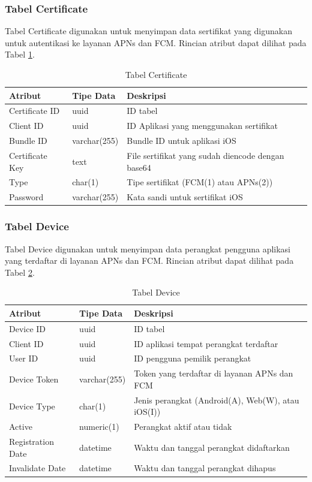\subsubsection{Tabel Certificate}
\par Tabel Certificate digunakan untuk menyimpan data sertifikat yang digunakan untuk autentikasi ke layanan APNs dan FCM. Rincian atribut dapat dilihat pada Tabel \ref{tabel_certificate}.
\begin{longtable}{|p{2cm}|p{2.5cm}|p{4.5cm}|}
	\caption{Tabel Certificate} \label{tabel_certificate} \\ \hline
    {Atribut} & {Tipe Data} & {Deskripsi} \\ \hline
    Certificate ID & uuid & ID tabel \\ \hline
    Client ID & uuid & ID Aplikasi yang menggunakan sertifikat \\ \hline
    Bundle ID & varchar(255) & Bundle ID untuk aplikasi iOS \\ \hline
    Certificate Key & text & File sertifikat yang sudah diencode dengan base64 \\ \hline
    Type & char(1) & Tipe sertifikat (FCM(1) atau APNs(2)) \\ \hline
    Password & varchar(255) & Kata sandi untuk sertifikat iOS \\ \hline
\end{longtable}

\subsubsection{Tabel Device}
\par Tabel Device digunakan untuk menyimpan data perangkat pengguna aplikasi yang terdaftar di layanan APNs dan FCM. Rincian atribut dapat dilihat pada Tabel \ref{tabel_device}.
\begin{longtable}{|p{2cm}|p{2.5cm}|p{4.5cm}|}
	\caption{Tabel Device} \label{tabel_device} \\ \hline
    {Atribut} & {Tipe Data} & {Deskripsi} \\ \hline
    Device ID & uuid & ID tabel \\ \hline
    Client ID & uuid & ID aplikasi tempat perangkat terdaftar \\ \hline
    User ID & uuid & ID pengguna pemilik perangkat \\ \hline
    Device Token & varchar(255) & Token yang terdaftar di layanan APNs dan FCM \\ \hline
    Device Type & char(1) & Jenis perangkat (Android(A), Web(W), atau iOS(I)) \\ \hline
    Active & numeric(1) & Perangkat aktif atau tidak \\ \hline
    Registration Date & datetime & Waktu dan tanggal perangkat didaftarkan \\ \hline
    Invalidate Date & datetime & Waktu dan tanggal perangkat dihapus \\ \hline
\end{longtable}

